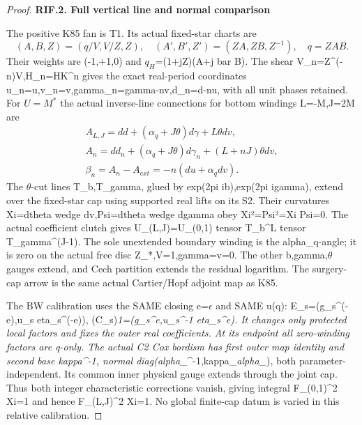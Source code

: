 \begin{proof}
\medskip\noindent\textbf{RIF.2. Full vertical line and normal comparison}

\par\nobreak

The positive K85 fan is T1. Its actual fixed-star charts are
\[
(A,B,Z)=(q/V,V/Z,Z),\quad(A',B',Z')=(ZA,ZB,Z^{-1}),\quad q=ZAB.
\]
Their weights are (-1,+1,0) and \(q_H\)=(1+jZ)(A+j bar B). The shear
V\_n=Z\^{}(-n)V,H\_n=HK\^{}n gives the exact real-period coordinates
u\_n=u,v\_n=v,gamma\_n=gamma-nv,d\_n=d-nu, with all unit phases retained.
For \(U=M^*\) the actual inverse-line connections for bottom windings
L=-M,J=2M are
\[
\begin{gathered}A_{L,J}=dd+(\alpha_q+J\theta)d\gamma+L\theta dv,\\
A_n=dd_n+(\alpha_q+J\theta)d\gamma_n+(L+nJ)\theta dv,\\
\beta_n=A_n-A_{ext}=-n(du+\alpha_qdv).\end{gathered}
\tag{RIF.6}
\]
The \(\theta\)-cut lines T\_b,T\_gamma, glued by exp(2pi ib),exp(2pi igamma),
extend over the fixed-star cap using supported real lifts on its S2.
Their curvatures Xi=dtheta wedge dv,Psi=dtheta wedge dgamma obey
Xi²=Psi²=Xi Psi=0. The actual coefficient clutch gives
U\_(L,J)=U\_(0,1) tensor T\_b\^{}L tensor T\_gamma\^{}(J-1). The sole unextended
boundary winding is the alpha\_q-angle; it is zero on the actual free
disc \textbar Z\_*,V=1,gamma=v=0. The other b,gamma,\(\theta\) gauges extend,
and Cech partition extends the residual logarithm. The surgery-cap
arrow is the same actual Cartier/Hopf adjoint map as K85.

The BW calibration uses the SAME closing e=\(\epsilon\) and SAME u(q):
E\_s=(g\_s\^{}(-e),u\_s eta\_s\^{}(-e)), (C\_s)\emph{1=(g\_s\^{}e,u\_s\^{}-1 eta\_s\^{}e).
It changes only protected local factors and fixes the outer real
coefficients. At its endpoint all zero-winding factors are q-only.
The actual C2 Cox bordism has first outer map identity and second
base kappa\^{}-1, normal diag(alpha\_}\^{}-1,kappa\_\emph{alpha\_}), both parameter-
independent. Its common inner physical gauge extends through the
joint cap. Thus both integer characteristic corrections vanish,
giving integral F\_(0,1)\^{}2 Xi=1 and hence F\_(L,J)\^{}2 Xi=1. No global
finite-cap datum is varied in this relative calibration.


\end{proof}
